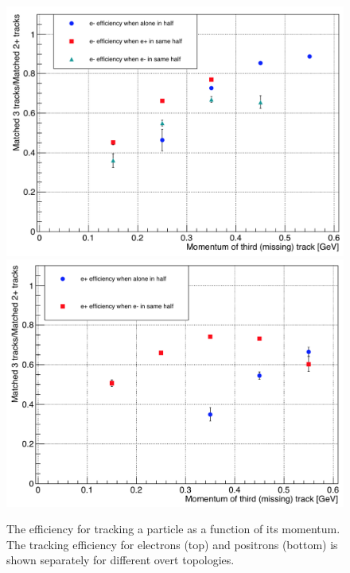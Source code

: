 \begin{figure}[hbt]
\begin{minipage}{0.55\textwidth}
	  \includegraphics[width=\textwidth]{pics/performance/em_trkEff.png}
    	  \includegraphics[width=\textwidth]{pics/performance/ep_trkEff.png}
\end{minipage}\hfill\begin{minipage}{0.32\textwidth}
\caption[Tracking efficiency from three particle final state events]{ \label{fig:eff3prong} \baselineskip 11pt
{The efficiency for tracking a particle as a function of its momentum. The tracking efficiency for electrons (top) and positrons (bottom) is shown separately for different overt topologies.}
}
\end{minipage}
\end{figure}

